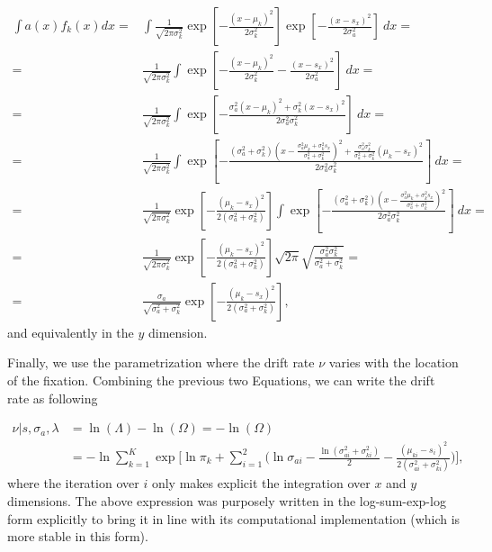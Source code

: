 \documentclass{article}
\begin{document}
\begin{equation}
\begin{aligned}
\int a(x)f_k(x) dx = & \int \frac{1}{\sqrt{2\pi\sigma_k^2}} \exp\left[-\frac{(x-\mu_k)^2}{2\sigma_k^2}\right] \exp\left[-\frac{(x-s_x)^2}{2\sigma_a^2}\right]~dx = \\
= & \frac{1}{\sqrt{2\pi\sigma_k^2}} \int \exp\left[-\frac{(x-\mu_k)^2}{2\sigma_k^2} - \frac{(x-s_x)^2}{2\sigma_a^2}\right]~dx = \\
= & \frac{1}{\sqrt{2\pi\sigma_k^2}} \int \exp\left[-\frac{\sigma_a^2(x-\mu_k)^2 + \sigma_k^2(x-s_x)^2}{2\sigma_a^2\sigma_k^2} \right]~dx = \\
= & \frac{1}{\sqrt{2\pi\sigma_k^2}} \int \exp\left[-\frac{(\sigma_a^2+\sigma_k^2)\left(x-\frac{\sigma_a^2\mu_k + \sigma_k^2s_x}{\sigma_a^2+\sigma_k^2}\right)^2 + \frac{\sigma_a^2\sigma_k^2}{\sigma_a^2 + \sigma_k^2}(\mu_k-s_x)^2}{2\sigma_a^2\sigma_k^2} \right]~dx = \\
= & \frac{1}{\sqrt{2\pi\sigma_k^2}} \exp\left[-\frac{(\mu_k-s_x)^2}{2(\sigma_a^2 + \sigma_k^2)}\right] \int \exp\left[-\frac{(\sigma_a^2+\sigma_k^2)\left(x-\frac{\sigma_a^2\mu_k + \sigma_k^2s_x}{\sigma_a^2+\sigma_k^2}\right)^2}{2\sigma_a^2\sigma_k^2} \right]~dx = \\
= & \frac{1}{\sqrt{2\pi\sigma_k^2}} \exp\left[-\frac{(\mu_k-s_x)^2}{2(\sigma_a^2 + \sigma_k^2)}\right] \sqrt{2\pi} \sqrt{\frac{\sigma_a^2\sigma_k^2}{\sigma_a^2+\sigma_k^2}} = \\
= & \frac{\sigma_a}{\sqrt{\sigma_a^2+\sigma_k^2}} \exp\left[-\frac{(\mu_k-s_x)^2}{2(\sigma_a^2 + \sigma_k^2)}\right],
\end{aligned}
\end{equation}
and equivalently in the $y$ dimension.

Finally, we use the parametrization where the drift rate $\nu$ varies with the location of the fixation. Combining the previous two Equations, we can write the drift rate as following

\begin{equation}
\label{eq:nuAsLogOmega}
\begin{aligned}
\nu | s, \sigma_a, \lambda & = \ln(\Lambda) - \ln(\Omega) = - \ln(\Omega) \\
& = - \ln \sum_{k=1}^K \exp \Bigg[\ln \pi_k + \sum_{i=1}^2 \Big( \ln \sigma_{ai} - \frac{\ln (\sigma_{ai}^2+ \sigma_{ki}^2)}{2} - \frac{(\mu_{ki} - s_i)^2}{2(\sigma_{ai}^2 + \sigma_{ki}^2)} \Big)  \Bigg],
\end{aligned}
\end{equation}
where the iteration over $i$ only makes explicit the integration over $x$ and $y$ dimensions. The above expression was purposely written in the log-sum-exp-log form explicitly to bring it in line with its computational implementation (which is more stable in this form). 
\end{document}
